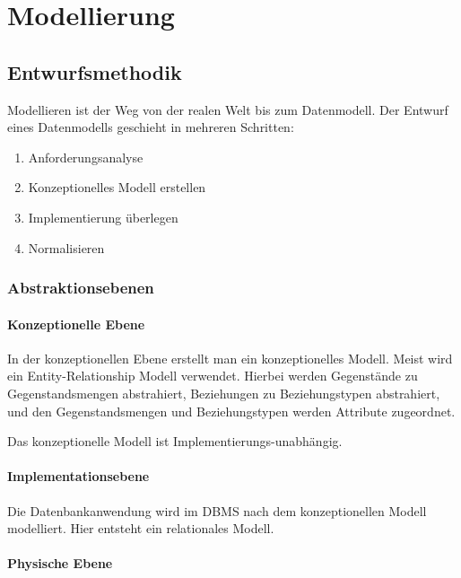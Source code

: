 \chapter{Modellierung}\label{cha:modellierung}

\section{Entwurfsmethodik}

Modellieren ist der Weg von der realen Welt bis zum Datenmodell.
Der Entwurf eines Datenmodells geschieht in mehreren Schritten:
\begin{enumerate}
    \item Anforderungsanalyse
    \item Konzeptionelles Modell erstellen
    \item Implementierung überlegen
    \item Normalisieren
\end{enumerate}

\subsection{Abstraktionsebenen}

\subsubsection{Konzeptionelle Ebene}

In der konzeptionellen Ebene erstellt man ein konzeptionelles Modell. Meist wird ein Entity-Relationship Modell verwendet. Hierbei werden Gegenstände zu Gegenstandsmengen abstrahiert, Beziehungen zu Beziehungstypen abstrahiert, und den Gegenstandsmengen und Beziehungstypen werden Attribute zugeordnet.

Das konzeptionelle Modell ist Implementierungs-unabhängig.

\subsubsection{Implementationsebene}

Die Datenbankanwendung wird im DBMS nach dem konzeptionellen Modell modelliert. Hier entsteht ein relationales Modell. 

\subsubsection{Physische Ebene}

